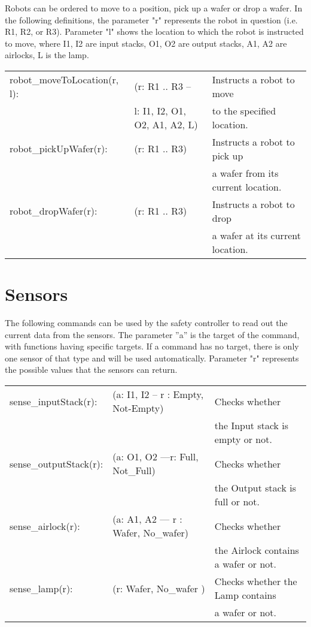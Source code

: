 Robots can be ordered to move to a position, pick up a wafer or drop a
wafer. In the following definitions, the parameter "r" represents the robot in question (i.e. R1, R2, or R3). Parameter "l" shows the location to which the robot is instructed to move, where I1, I2 are input stacks, O1, O2 are output stacks, A1, A2 are airlocks, L is the lamp.

\begin{tabular}{ l l l }
  robot_moveToLocation(r, l): & (r: R1 .. R3 -- & Instructs a robot to move \\
  &  l: I1, I2, O1, O2, A1, A2, L) & to the specified location. \\
  robot_pickUpWafer(r): & (r: R1 .. R3) & Instructs a robot to pick up \\
  & & a wafer from its current location. \\
  robot_dropWafer(r): & (r: R1 .. R3) & Instructs a robot to drop \\
  & & a wafer at its current location. \\
\end{tabular}

\section{Sensors}

The following commands can be used by the safety controller to read out the current data from the sensors. The parameter ”a” is the target of the command, with functions having specific targets. If a command has no target, there is only one sensor of that type and will be used automatically. Parameter "r" represents the possible values that the sensors can return.

\begin{tabular}{ l l l }
  sense_inputStack(r): & (a: I1, I2 -- r : Empty, Not-Empty) & Checks whether \\
  & & the Input stack is empty or not. \\
  sense_outputStack(r): & (a: O1, O2 —r: Full, Not_Full) & Checks whether \\
  & & the Output stack is full or not. \\
  sense_airlock(r): & (a: A1, A2 — r : Wafer, No_wafer) & Checks whether \\
  & & the Airlock contains a wafer or not. \\
  sense_lamp(r): & (r: Wafer, No_wafer ) & Checks whether the Lamp contains \\
  & & a wafer or not. \\
\end{tabular}
